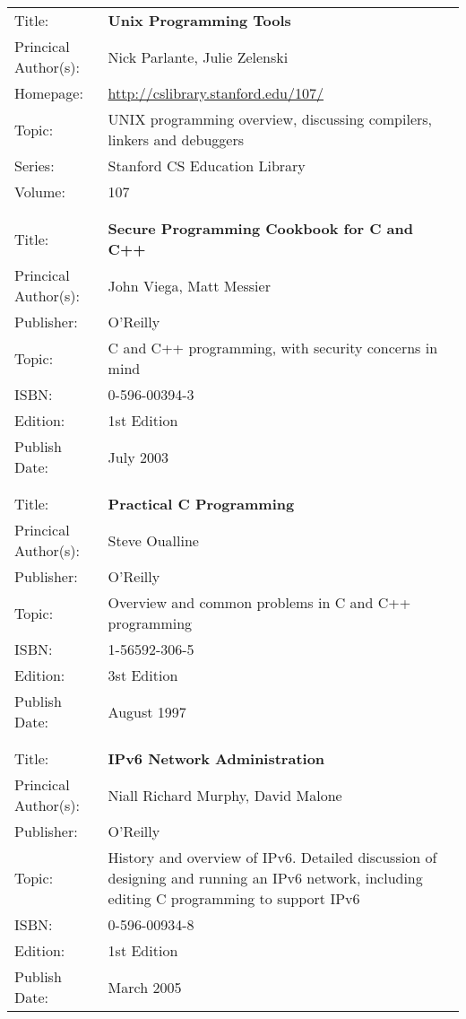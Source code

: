 
\begin{tabular}{ll}
Title: &	\textbf{Unix Programming Tools}	\\
Princical Author(s): &	Nick Parlante, Julie Zelenski \\
Homepage: &	\url{http://cslibrary.stanford.edu/107/}	\\	
Topic:	&	UNIX programming overview, discussing compilers, linkers and debuggers \\
Series:	&	Stanford CS Education Library	\\
Volume:	&	107 \\

	&	\\
	&	\\

Title: &	\textbf{Secure Programming Cookbook for C and C++}	\\
Princical Author(s): &	John Viega, Matt Messier  \\
Publisher:&	O'Reilly	\\	
Topic:	&	C and C++ programming, with security concerns in mind \\
ISBN:		&	0-596-00394-3 \\
Edition:	&	1st Edition \\
Publish Date:	&	July 2003 \\

	&	\\
	&	\\
	
Title: &	\textbf{Practical C Programming}	\\
Princical Author(s): &	Steve Oualline  \\
Publisher:&	O'Reilly	\\	
Topic:	&	Overview and common problems in C and C++ programming \\
ISBN:		&	1-56592-306-5 \\
Edition:	&	3st Edition \\
Publish Date:	&	August 1997 \\

	&	\\
	&	\\

Title: &	\textbf{IPv6 Network Administration}	\\
Princical Author(s): &	Niall Richard Murphy, David Malone  \\
Publisher:&	O'Reilly	\\	
Topic:	&	History and overview of IPv6. Detailed discussion of
designing and running an IPv6 network, including editing C programming
to support IPv6 \\
ISBN:		&	0-596-00934-8 \\
Edition:	&	1st Edition \\
Publish Date:	&	March 2005 \\


\end{tabular}
